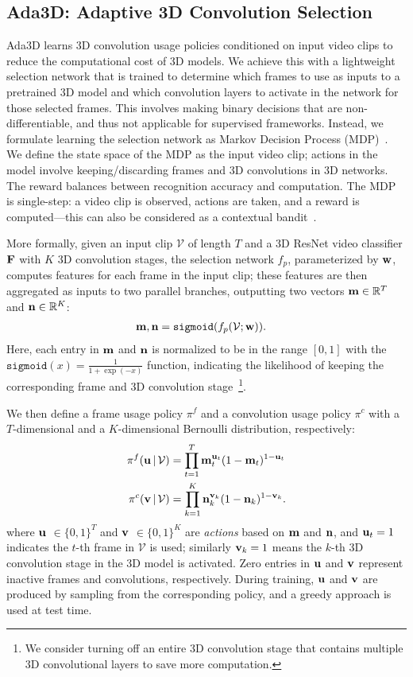 \documentclass[final]{cvpr}
\newcommand{\system}{{Ada3D}\xspace}
\begin{document}
\subsection{\system: Adaptive 3D Convolution Selection}
\label{sec:ada3d}
\system learns 3D convolution usage policies conditioned on input video clips to reduce the computational cost of 3D models. We achieve this with a lightweight selection network that is trained to determine which frames to use as inputs to a pretrained 3D model and which convolution layers to activate in the network for those selected frames. 
This involves making binary decisions that are non-differentiable, and thus not applicable for supervised frameworks. Instead, we formulate learning the selection network as Markov Decision Process (MDP)~\cite{mdp}. We define the state space of the MDP as the input video clip; actions in the model involve keeping/discarding frames and 3D convolutions in 3D networks. The reward balances between recognition accuracy and computation.
The MDP is single-step: a video clip is observed, actions are taken, and a reward is computed---this can also be considered as a contextual bandit~\cite{bandit}.


More formally, given an input clip $\mathcal{V}$ of length $T$ and a 3D ResNet video classifier $\bf F$ with $K$ 3D convolution stages, the selection network $f_p$, parameterized by $\bf w$, computes features for each frame in the input clip; these features are then aggregated as inputs to two parallel branches, outputting two vectors ${\bf m} \in \mathbb{R}^T$ and ${\bf n} \in \mathbb{R}^K$:
\begin{align}
{\bf m}, {\bf n}  & = \texttt{sigmoid}(f_{p}({\bf \mathcal{V}}; {\bf w})).
\end{align} 
Here, each entry in $\bf m$ and $\bf n$ is normalized to be in the range $[0, 1]$ with the $\texttt{sigmoid}(x) = \frac{1}{1 + \exp(-x)}$ function, indicating the likelihood of keeping the corresponding frame and 3D convolution stage~\footnote{We consider turning off an entire 3D convolution stage that contains multiple 3D convolutional layers to save more computation.\label{footnote:3dstage}}. 



We then define a frame usage policy $\pi^f$ and a convolution usage policy $\pi^c$ with a $T$-dimensional and a $K$-dimensional Bernoulli distribution, respectively:
\begin{align}
\pi^f ({\bf u}\,|\, \mathcal{V}) & = \prod_{t=1}^{T} {\bf m}_t^{{\bf u}_t}(1-{\bf m}_t)^{1-{\bf u}_t} \\
\pi^c ({\bf v}\,|\, \mathcal{V}) & = \prod_{k=1}^{K} {\bf n}_k^{{\bf v}_k}(1-{\bf n}_k)^{1-{\bf v}_k}.
\label{eqn:bernoulli}
\end{align}
where $\bf u$ $\in \{0, 1\}^T$ and $\bf v$ $\in \{0, 1\}^K$ are \emph{actions} based on $\bf m$ and $\bf n$, and ${\bf u}_t = 1$ indicates the $t$-th frame in $\mathcal{V}$ is used; similarly ${\bf v}_k = 1$ means the $k$-th 3D convolution stage in the 3D model is activated. Zero entries in $\bf u$ and $\bf v$ represent inactive frames and convolutions, respectively. During training, ${\bf u}$ and ${\bf v}$ are produced by sampling from the corresponding policy, and a greedy approach is used at test time.
\end{document}

